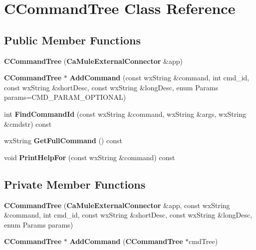 \section{CCommandTree Class Reference}
\label{classCCommandTree}
\subsection*{Public Member Functions}
\begin{DoxyCompactItemize}
\item 
{\bfseries CCommandTree} ({\bf CaMuleExternalConnector} \&app)\label{classCCommandTree_a232375cc7454085f41116f6e366eb8f4}

\item 
{\bf CCommandTree} $\ast$ {\bfseries AddCommand} (const wxString \&command, int cmd\_\-id, const wxString \&shortDesc, const wxString \&longDesc, enum Params params=CMD\_\-PARAM\_\-OPTIONAL)\label{classCCommandTree_a1572754f175806d6462399958b2cacdb}

\item 
int {\bfseries FindCommandId} (const wxString \&command, wxString \&args, wxString \&cmdstr) const \label{classCCommandTree_a419516888ce5c3851a81589b1b3dd233}

\item 
wxString {\bfseries GetFullCommand} () const \label{classCCommandTree_aa13c14fba11aa89d49daff555daed2f6}

\item 
void {\bfseries PrintHelpFor} (const wxString \&command) const \label{classCCommandTree_a5763a9a9f079dbead01821e0ad19ea57}

\end{DoxyCompactItemize}
\subsection*{Private Member Functions}
\begin{DoxyCompactItemize}
\item 
{\bfseries CCommandTree} ({\bf CaMuleExternalConnector} \&app, const wxString \&command, int cmd\_\-id, const wxString \&shortDesc, const wxString \&longDesc, enum Params params)\label{classCCommandTree_aab7555a9f1892593b31f7f973d48ec9f}

\item 
{\bf CCommandTree} $\ast$ {\bfseries AddCommand} ({\bf CCommandTree} $\ast$cmdTree)\label{classCCommandTree_a0bc7ffdc100934e312fcc06cac12b9cc}

\end{DoxyCompactItemize}
